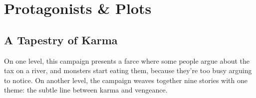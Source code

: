 \chapter{Protagonists \& Plots}
\label{sideQuestIntro}

\section{A Tapestry of Karma}
\label{sqSummaries}


\noindent
On one level, this \gls{campaign} presents a farce where some people argue about the tax on a river, and monsters start eating them, because they're too busy arguing to notice.
On another level, the \gls{campaign} weaves together nine stories with one theme: the subtle line between karma and vengeance.

